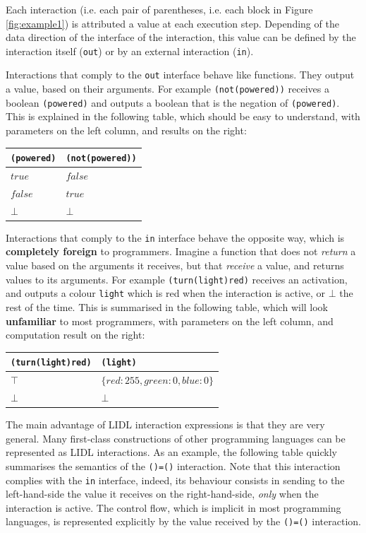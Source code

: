 \documentclass[10pt]{sigplanconf}
\newcommand{\code}[1]{\lstinline{#1}}
\begin{document}
Each interaction (i.e. each pair of parentheses, i.e. each block in Figure \ref{fig:example1}) is attributed a value at each execution step.  Depending of the data direction of the interface of the interaction, this value can be defined by the interaction itself (\code{out}) or by an external interaction (\code{in}). 

Interactions that comply to the \code{out} interface behave like functions. They output a value, based on their arguments. For example \code{(not(powered))} receives a boolean \code{(powered)} and outputs a boolean that is the negation of \code{(powered)}. This is explained in the following table, which should be easy to understand, with parameters on the left column, and results on the right: 

\begin{tabularx}{\linewidth}{X|X}
  \texttt{(powered)}& \texttt{(not(powered))} \\
  \hline
  $true$& $false$ \\
  $false$&  $true$\\
  $\bot$ & $\bot$
\end{tabularx}

Interactions that comply to the \code{in} interface behave the opposite way, which is \textbf{completely foreign} to programmers. Imagine a function that does not \emph{return} a value based on the arguments it receives, but that \emph{receive} a value, and returns values to its arguments. For example \code{(turn(light)red)} receives an activation, and outputs a colour \code{light} which is red when the interaction is active, or $\bot$ the rest of the time. This is summarised in the following table, which will look \textbf{unfamiliar} to most programmers, with parameters on the left column, and computation result on the right:


\begin{tabularx}{\linewidth}{l|X}
  \texttt{(turn(light)red)} &\texttt{(light)} \\
  \hline
  $\top$ & $\{red:255,green:0,blue:0\}$ \\
  $\bot$ & $\bot$ 
\end{tabularx}

The main advantage of LIDL interaction expressions is that they are very general. Many first-class constructions of other programming languages can be represented as LIDL interactions. As an example, the following table quickly summarises the semantics of the \code{()=()} interaction. Note that this interaction complies with the \code{in} interface, indeed, its behaviour consists in sending to the left-hand-side the value it receives on the right-hand-side, \emph{only} when the interaction is active. The control flow, which is implicit in most programming languages, is represented explicitly by the value received by the \code{()=()} interaction.
\end{document}
